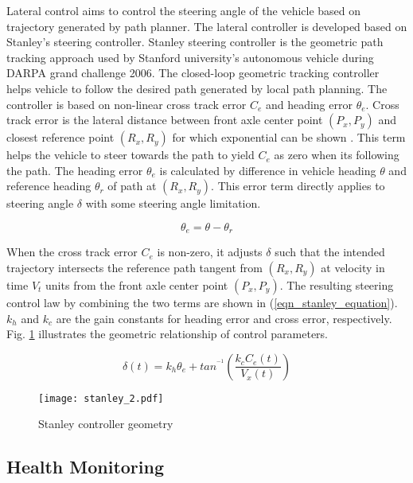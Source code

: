 \documentclass[10 pt,a4paper,conference]{IEEEtran}
\begin{document}
Lateral control aims to control the steering angle of the vehicle based
on trajectory generated by path planner. The lateral controller is
developed based on Stanley's \citep{ventures2006stanley} steering
controller. Stanley steering controller is the geometric path tracking
approach used by Stanford university's autonomous vehicle during DARPA
grand challenge 2006. The closed-loop geometric tracking controller
helps vehicle to follow the desired path generated by local path
planning. The controller is based on non-linear cross track error
\(C_{e}\) and heading error \(\theta_{e}\). Cross track error is the
lateral distance between front axle center point \((P_{x}, P_{y})\) and
closest reference point \((R_{x}, R_{y})\) for which exponential can be
shown \citep{ventures2006stanley}. This term helps the vehicle to steer
towards the path to yield \(C_{e}\) as zero when its following the path.
The heading error \(\theta_{e}\) is calculated by difference in vehicle
heading \(\theta\) and reference heading \(\theta_{r}\) of path at
\((R_{x}, R_{y})\). This error term directly applies to steering angle
\(\delta\) with some steering angle limitation.

\begin{equation}
\label{eqn_heading_error}
\theta_{e} = \theta - \theta_{r}
\end{equation}

When the cross track error \(C_{e}\) is non-zero, it adjusts \(\delta\)
such that the intended trajectory intersects the reference path tangent
from \((R_{x}, R_{y})\) at velocity in time \(V_{t}\) units from the
front axle center point \((P_{x}, P_{y})\). The resulting steering
control law by combining the two terms are shown in
(\ref{eqn_stanley_equation}). \(k_{h}\) and \(k_{c}\) are the gain
constants for heading error and cross error, respectively. Fig.
\ref{fig_stanley} illustrates the geometric relationship of control
parameters.

\begin{equation}
\label{eqn_stanley_equation}
\delta(t) = k_{h}\theta_{e} + tan^{^{-1}}\left (\frac{k_{c}C_{e}(t)}{V_{x}(t)}  \right )
\end{equation}

\begin{figure}[!t]
\centering
\texttt{[image: stanley\_2.pdf]}
\caption{Stanley controller geometry}
\label{fig_stanley}
\end{figure}

\subsection{Health Monitoring}\label{health-monitoring}
\end{document}
